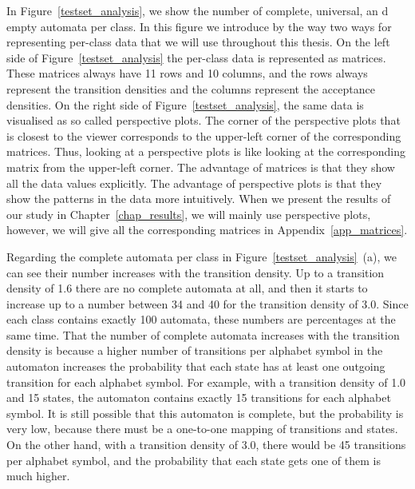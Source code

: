In Figure~\ref{testset_analysis}, we show the number of complete, universal, an d empty automata per class. In this figure we introduce by the way two ways for representing per-class data that we will use throughout this thesis. On the left side of Figure~\ref{testset_analysis} the per-class data is represented as matrices. These matrices always have 11 rows and 10 columns, and the rows always represent the transition densities and the columns represent the acceptance densities. On the right side of Figure~\ref{testset_analysis}, the same data is visualised as so called perspective plots. The corner of the perspective plots that is closest to the viewer corresponds to the upper-left corner of the corresponding matrices. Thus, looking at a perspective plots is like looking at the corresponding matrix from the upper-left corner. The advantage of matrices is that they show all the data values explicitly. The advantage of perspective plots is that they show the patterns in the data more intuitively. When we present the results of our study in Chapter~\ref{chap_results}, we will mainly use perspective plots, however, we will give all the corresponding matrices in Appendix~\ref{app_matrices}.

Regarding the complete automata per class in Figure~\ref{testset_analysis}~(a), we can see their number increases with the transition density. Up to a transition density of 1.6 there are no complete automata at all, and then it starts to increase up to a number between 34 and 40 for the transition density of 3.0. Since each class contains exactly 100 automata, these numbers are percentages at the same time. That the number of complete automata increases with the transition density is because a higher number of transitions per alphabet symbol in the automaton increases the probability that each state has at least one outgoing transition for each alphabet symbol. For example, with a transition density of 1.0 and 15 states, the automaton contains exactly 15 transitions for each alphabet symbol. It is still possible that this automaton is complete, but the probability is very low, because there must be a one-to-one mapping of transitions and states. On the other hand, with a transition density of 3.0, there would be 45 transitions per alphabet symbol, and the probability that each state gets one of them is much higher.

